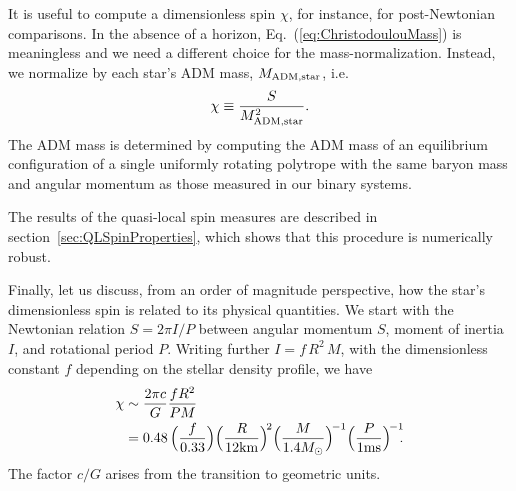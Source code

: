 \documentclass[aps,prd,amsmath,floatfix
,twocolumn
,superscriptaddress,nofootinbib,showpacs]{revtex4-1}
\theoremstyle{plain} \newtheorem{thm}{Theorem} \newtheorem{lem}{Lemma}
\newcommand{\roland}[1]{\textcolor{Magenta}{\textit{ROLAND: #1}}}
\begin{document}
It is useful to compute a dimensionless spin $\chi$, for instance, for
post-Newtonian comparisons.  In the absence of a horizon,
Eq.~(\ref{eq:ChristodoulouMass}) is meaningless and we need a different
choice for the mass-normalization.  Instead, we normalize by each 
star's ADM mass, $M_{\rm{ADM, star}}$, i.e. 
\begin{equation}
\chi\equiv \frac{S}{M_{\rm ADM, star}^2}.
\end{equation}
The ADM mass is determined by computing the ADM mass of an equilibrium configuration of a single uniformly rotating polytrope with the same baryon mass and angular momentum as those measured in our binary systems.


The results of the
quasi-local spin measures are described in
section~\ref{sec:QLSpinProperties}, which shows that this procedure is
numerically robust.


Finally, let us discuss, from an order of magnitude perspective, how
the star's dimensionless spin is related to its physical quantities.
We start with the Newtonian relation $S=2\pi I/P$ between angular
momentum $S$, moment of inertia $I$, and rotational period $P$.
Writing further $I=f\,R^2\,M$, with the dimensionless constant $f$
depending on the stellar density profile, we have 
\begin{align}
\chi&\sim\frac{2\pi c}{G}\frac{fR^2}{PM} \nonumber\\
&=
0.48\,\Big(\frac{f}{0.33}\Big)\Big(\frac{R}{12{\rm
    km}}\Big)^{\!2}\Big(\frac{M}{1.4M_{\odot}}\Big)^{\!-1}\Big(\frac{P}{1{\rm
    ms}}\Big)^{\!-1}\!\!.
\end{align}
The factor $c/G$ arises from the transition to geometric units. 
\end{document}

